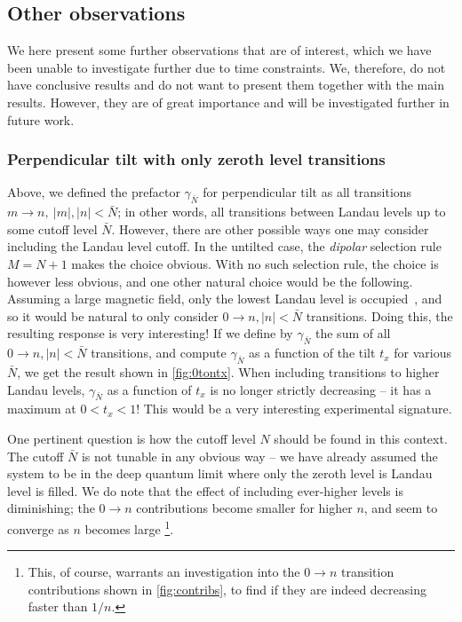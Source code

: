 \FloatBarrier
\subsection{Other observations}\label{sec:other-observe}
We here present some further observations that are of interest, which we have been unable to investigate further due to time constraints.
We, therefore, do not have conclusive results and do not want to present them together with the main results.
However, they are of great importance and will be investigated further in future work.

\subsubsection{Perpendicular tilt with only zeroth level transitions}\label{sec:other-observe:zeroton}
Above, we defined the prefactor \( \gamma_{\bar{N}} \) for perpendicular tilt as all transitions \( m\to n, \: |m|,|n| < \bar{N} \);
in other words, all transitions between Landau levels up to some cutoff level \( \bar{N} \).
However, there are other possible ways one may consider including the Landau level cutoff.
In the untilted case, the \emph{dipolar} selection rule \( M = N + 1 \) makes the choice obvious.
With no such selection rule, the choice is however less obvious, and one other natural choice would be the following.
Assuming a large magnetic field, only the lowest Landau level is occupied~\cite{chernodubThermalTransportGeometry2021}, and so it would be natural to only consider \( 0 \to n, |n| < \bar{N} \) transitions.
Doing this, the resulting response is very interesting!
If we define by \( \gamma_{\bar{N}} \) the sum of all \( 0\to n, |n| < \bar{N} \) transitions, and compute \( \gamma_{\bar{N}} \) as a function of the tilt \( t_x \) for various \( \bar{N} \), we get the result shown in \cref{fig:0tontx}.
When including transitions to higher Landau levels, \( \gamma_{\bar{N}} \) as a function of \( t_x \) is no longer strictly decreasing -- it has a maximum at \( 0 < t_x < 1 \)!
This would be a very interesting experimental signature.

One pertinent question is how the cutoff level \( N \) should be found in this context.
The cutoff \( \bar{N} \) is not tunable in any obvious way -- we have already assumed the system to be in the deep quantum limit where only the zeroth level is Landau level is filled.
We do note that the effect of including ever-higher levels is diminishing;
the \( 0 \to n \) contributions become smaller for higher \( n \), and seem to converge as \( n \) becomes large%
\footnote{This, of course, warrants an investigation into the \( 0\to n \) transition contributions shown in \cref{fig:contribs}, to find if they are indeed decreasing faster than \( 1 / n \).}.

